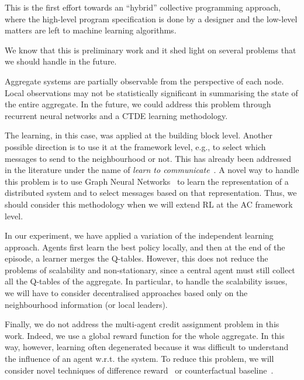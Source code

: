 \documentclass[conference]{IEEEtran}
\begin{document}
This is the first effort towards an ``hybrid'' collective programming approach, where the high-level program specification is 
 done by a designer and the low-level matters are left to machine learning algorithms.

We know that this is preliminary work and it shed light on several problems that we should handle in the future.

Aggregate systems are partially observable from the perspective of each node. 
 Local observations may not be statistically significant in summarising the state of the entire aggregate. 
 In the future, we could address this problem through recurrent neural networks and a CTDE learning methodology.
 
The learning, in this case, was applied at the building block level. 
 Another possible direction is to use it at the framework level, e.g., to select which messages to send to the neighbourhood or not. 
 This has already been addressed in the literature under the name of \textit{learn to communicate}~\cite{DBLP:journals/corr/abs-1908-03963}. 
A novel way to handle this problem is to use Graph Neural Networks~\cite{DBLP:journals/corr/abs-1812-08434} to learn the representation of a distributed system and to select messages based on that representation. 
 Thus, we should consider this methodology when we will extend RL at the AC framework level.
 
In our experiment, we have applied a variation of the independent learning approach. 
 Agents first learn the best policy locally, and then at the end of the episode, a learner merges the Q-tables. 
 However, this does not reduce the problems of scalability and non-stationary, since a central agent must still collect all the Q-tables of the aggregate. 
 In particular, to handle the scalability issues, we will have to consider decentralised approaches based only on the neighbourhood information (or local leaders).
 
Finally, we do not address the multi-agent credit assignment problem in this work. 
 Indeed, we use a global reward function for the whole aggregate. In this way, however, learning often degenerated because it was difficult to understand the influence of an agent w.r.t. the system. 
 To reduce this problem, we will consider novel techniques of difference reward~\cite{DBLP:conf/atal/AgoginoT04} or counterfactual baseline~\cite{DBLP:journals/corr/FoersterFANW17}.



\end{document}
